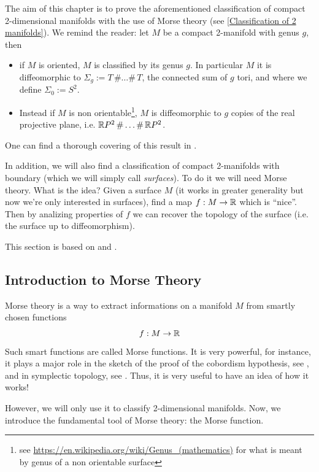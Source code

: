 The aim of this chapter is to prove the aforementioned classification of compact 2-dimensional manifolds with the use of Morse theory (see \ref{Classification of 2 manifolds}). We remind the reader: let $M$ be a compact 2-manifold with genus $g$, then \begin{itemize}
    \item if $M$ is oriented, $M$ is classified by its genus $g$. In particular $M$ it is diffeomorphic to $\Sigma_g:=T\,\# \dots\#\,T$, the connected sum of $g$ tori, and where we define $\Sigma_0:=S^2$.
    \item Instead if $M$ is non orientable\footnote{see \url{https://en.wikipedia.org/wiki/Genus_(mathematics)} for what is meant by genus of a non orientable surface}, $M$ is diffeomorphic to $g$ copies of the real projective plane, i.e.  $\mathbb{R} P^2\,\# \dots \#\,\mathbb{R} P^2$.
\end{itemize} 

One can find a thorough covering of this result in \cite[Chapter 3, page 200]{Hirsch1976}.

\noindent In addition, we will also find a classification of compact 2-manifolds with boundary (which we will simply call \textit{surfaces}). To do it we will need Morse theory. What is the idea? Given a surface $M$ (it works in greater generality but now we're only interested in surfaces), find a map $f: M \to \mathbb{R}$ which is ``nice''.
Then by analizing properties of $f$ we can recover the topology of the surface (i.e. the surface up to diffeomorphism). 

\noindent This section is based on \cite{Hirsch1976} and \cite{kosinski2013differential}.

\subsection{Introduction to Morse Theory}
Morse theory is a way to extract informations on a manifold $M$ from smartly chosen functions 
$$f:M\to \mathbb{R}$$
Such smart functions are called Morse functions. It is very powerful, for instance, it plays a major role 
in the sketch of the proof of the cobordism hypothesis, see \cite{lurie2009classification}, and
in symplectic topology, see \cite{HiroLee2022}. 
Thus, it is very useful to have an idea of how it works!

However, we will only use it to classify 2-dimensional manifolds. Now, we introduce the fundamental tool
of Morse theory: the Morse function.


